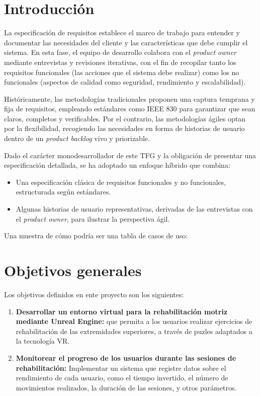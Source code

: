 
\section{Introducción}
La especificación de requisitos establece el marco de trabajo para entender y documentar las necesidades del cliente y las características que debe cumplir el sistema. En esta fase, el equipo de desarrollo colabora con el \emph{product owner} mediante entrevistas y revisiones iterativas, con el fin de recopilar tanto los requisitos funcionales (las acciones que el sistema debe realizar) como los no funcionales (aspectos de calidad como seguridad, rendimiento y escalabilidad).

Históricamente, las metodologías tradicionales proponen una captura temprana y fija de requisitos, empleando estándares como IEEE 830 para garantizar que sean claros, completos y verificables. Por el contrario, las metodologías ágiles optan por la flexibilidad, recogiendo las necesidades en forma de historias de usuario dentro de un \emph{product backlog} vivo y priorizable.

Dado el carácter monodesarrollador de este TFG y la obligación de presentar una especificación detallada, se ha adoptado un enfoque híbrido que combina:

\begin{itemize}
  \item Una especificación clásica de requisitos funcionales y no funcionales, estructurada según estándares.
  \item Algunas historias de usuario representativas, derivadas de las entrevistas con el \emph{product owner}, para ilustrar la perspectiva ágil.
\end{itemize}


Una muestra de cómo podría ser una tabla de casos de uso:

\section{Objetivos generales}
Los objetivos definidos en ente proyecto son los siguientes:
\begin{enumerate}
    \item \textbf{Desarrollar un entorno virtual para la rehabilitación motriz mediante Unreal Engine:} que permita a los usuarios realizar ejercicios de rehabilitación de las extremidades superiores, a través de puzles adaptados a la tecnología VR. 

    \item \textbf{Monitorear el progreso de los usuarios durante las sesiones de rehabilitación:} Implementar un sistema que registre datos sobre el rendimiento de cada usuario, como el tiempo invertido, el número de movimientos realizados, la duración de las sesiones, y otros parámetros.

\end{enumerate}
